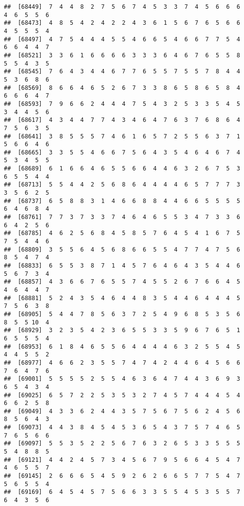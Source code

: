 \documentclass[
]{book}
\begin{document}
\begin{verbatim}
##  [68449]  7  4  4  8  2  7  5  6  7  4  5  3  3  7  4  5  6  6  6  4  6  5  5  6
##  [68473]  4  8  5  4  2  4  2  2  4  3  6  1  5  6  7  6  5  6  6  4  5  5  5  4
##  [68497]  4  7  5  4  4  4  5  5  4  6  6  5  4  6  6  7  7  5  4  6  6  4  4  7
##  [68521]  3  3  6  1  6  6  6  6  3  3  3  6  4  6  7  6  5  5  8  5  5  4  3  5
##  [68545]  7  6  4  3  4  4  6  7  7  6  5  5  7  5  5  7  8  4  4  5  3  6  8  6
##  [68569]  8  6  6  4  6  5  2  6  7  3  3  8  6  5  8  6  5  8  4  6  6  6  4  7
##  [68593]  7  9  6  6  2  4  4  4  7  5  4  3  2  5  3  3  5  4  5  3  4  4  5  6
##  [68617]  4  3  4  4  7  7  4  3  4  6  4  7  6  3  7  6  8  6  4  7  5  6  3  5
##  [68641]  3  8  5  5  5  7  4  6  1  6  5  7  2  5  5  6  3  7  1  5  6  6  4  6
##  [68665]  3  3  5  5  4  6  6  7  5  6  4  3  5  4  6  4  6  7  4  5  3  4  5  5
##  [68689]  6  1  6  6  4  6  5  5  6  6  4  4  6  3  2  6  7  5  3  6  5  5  4  4
##  [68713]  5  5  4  4  2  5  6  8  6  4  4  4  4  6  5  7  7  7  3  3  5  6  2  5
##  [68737]  6  5  8  8  3  1  4  6  6  8  8  4  4  6  6  5  5  5  5  6  4  6  8  4
##  [68761]  7  7  3  7  3  3  7  4  6  4  6  5  5  3  4  7  3  3  6  6  4  2  5  6
##  [68785]  4  6  2  5  6  8  4  5  8  5  7  6  4  5  4  1  6  7  5  7  5  4  4  6
##  [68809]  3  5  5  6  4  5  6  8  6  6  5  5  4  7  7  4  7  5  6  8  5  4  7  4
##  [68833]  6  5  5  3  8  7  1  4  5  7  6  4  6  4  3  5  4  4  6  5  6  7  3  4
##  [68857]  4  3  6  6  7  6  5  5  7  4  5  5  2  6  7  6  6  4  5  4  6  4  4  7
##  [68881]  5  2  4  3  5  4  6  4  4  8  3  5  4  4  6  4  4  4  5  7  5  6  3  8
##  [68905]  5  4  4  7  8  5  6  3  7  2  5  4  9  6  8  5  3  5  6  8  5  5 10  4
##  [68929]  3  2  3  5  4  2  3  6  5  5  3  3  5  9  6  7  6  5  1  6  5  5  5  4
##  [68953]  6  1  8  4  6  5  5  6  4  4  4  4  6  3  2  5  5  4  5  4  4  5  5  2
##  [68977]  4  6  6  2  3  5  5  7  4  7  4  2  4  4  6  4  5  6  6  7  6  4  7  6
##  [69001]  5  5  5  5  2  5  5  4  6  3  6  4  7  4  4  3  6  9  3  6  5  4  3  4
##  [69025]  6  5  7  2  2  5  3  5  3  2  7  4  5  7  4  4  4  5  4  6  6  2  5  8
##  [69049]  4  3  3  6  2  4  4  3  5  7  5  6  7  5  6  2  4  5  6  8  5  6  4  3
##  [69073]  4  4  3  8  4  5  4  5  3  6  5  4  3  7  5  7  4  6  5  7  6  5  6  6
##  [69097]  5  5  3  5  2  2  5  6  7  6  3  2  6  5  3  3  5  5  5  5  4  8  8  5
##  [69121]  4  4  2  4  5  7  3  4  5  6  7  9  5  6  6  4  5  4  7  4  6  5  5  7
##  [69145]  2  6  6  6  5  4  5  9  2  6  2  6  6  5  7  7  5  4  7  5  6  5  5  4
##  [69169]  6  4  5  4  5  7  5  6  6  3  3  5  5  4  5  3  5  5  7  6  4  3  5  6

\end{verbatim}
\end{document}
